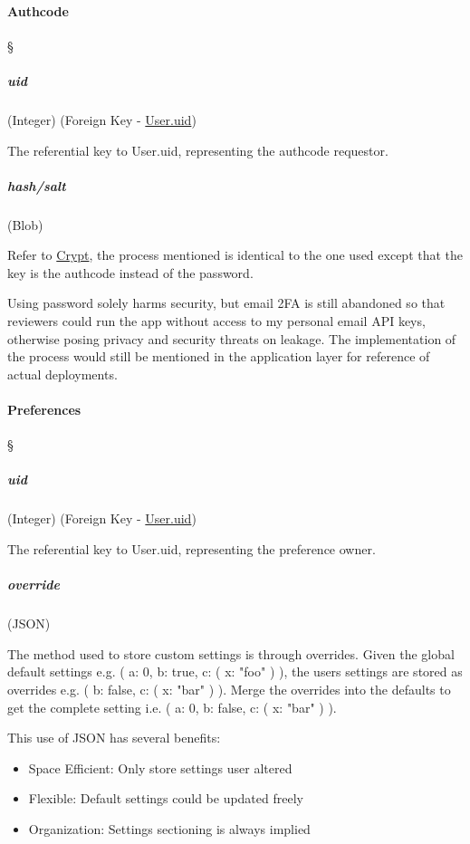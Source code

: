 \paragraph{Authcode \textdagger{}}
\S{} \label{data-layer.design.user.tables.code}

\subparagraph{uid}
(Integer) (Foreign Key -
\hyperref[data-layer.design.user.tables.user.uid]{User.uid}) \label{data-layer.design.user.tables.code.uid}

The referential key to User.uid, representing the authcode requestor.

\subparagraph{hash/salt}
(Blob) \label{data-layer.design.user.tables.code.crypt}

Refer to \hyperref[data-layer.design.user.tables.pswd.crypt]{Crypt}, the process
mentioned is identical to the one used except that the key is the authcode
instead of the password.

\textdagger{} Using password solely harms security, but email 2FA is still
abandoned so that reviewers could run the app without access to my personal
email API keys, otherwise posing privacy and security threats on leakage. The
implementation of the process would still be mentioned in the application layer
for reference of actual deployments.

\paragraph{Preferences \textdagger{}}
\S{} \label{data-layer.design.user.tables.pref}

\subparagraph{uid}
(Integer) (Foreign Key - \hyperref[data-layer.design.user.tables.user.uid]{User.uid})
\label{data-layer.design.user.tables.pref.uid}

The referential key to User.uid, representing the preference owner.

\subparagraph{override}
(JSON) \label{data-layer.design.user.tables.pref.override}

The method used to store custom settings is through overrides. Given the global default
settings e.g. ( a: 0, b: true, c: ( x: "foo" ) ), the users settings are stored as
overrides e.g. ( b: false, c: ( x: "bar" ) ). Merge the overrides into the defaults
to get the complete setting i.e. ( a: 0, b: false, c: ( x: "bar" ) ).

This use of JSON has several benefits:

\begin{itemize}
	\item Space Efficient: Only store settings user altered

	\item Flexible: Default settings could be updated freely

	\item Organization: Settings sectioning is always implied
\end{itemize}

